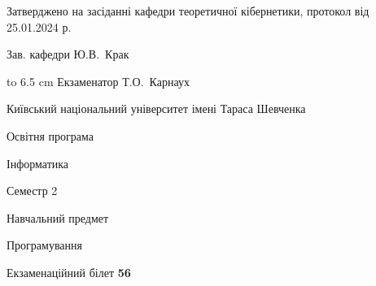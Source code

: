 \documentclass[12pt, ukrainian]{article}
\begin{document}
{\smallskip\smallskip \begin {scriptsize} Затверджено на засіданні кафедри теоретичної кібернетики, протокол   від   25.01.2024 р.\par\smallskip\smallskip\smallskip\smallskip
{\parbox {6.5 cm} {Зав. кафедри \dotfill Ю.В.~Крак}}\hspace {0.7cm} {\hbox to 6.5 cm { Екзаменатор \dotfill Т.О.~Карнаух}} \end{scriptsize}}
\newpage
{{\begin {scriptsize}\par
{ \center  Київський національний університет імені Тараса Шевченка \par}
{\parbox {5 cm}{Освітня програма \hfill}{\parbox {7 cm}{Інформатика\hfill}}\parbox {6 cm}{\hfill Семестр 2}}\par
{\parbox {5 cm} {Навчальний предмет \hfill}\parbox {7 cm}{Програмування \hfill}\parbox {6cm}{\hfill}\par}\vspace{-15pt} \end{scriptsize}}{\center Екзаменаційний білет \No \textbf { 56 }\par}}
\end{document}
